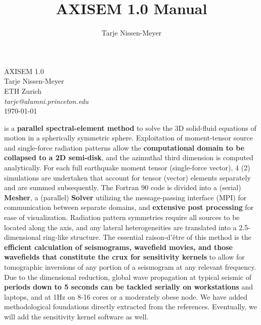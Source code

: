 \documentclass[11pt,letter,fleqn,english,notitlepage]{article}
\title{AXISEM 1.0 Manual}
\author{Tarje Nissen-Meyer}
\begin{document}
%
\pagestyle{fancy}
\thispagestyle{empty}
%
\begin{center}
{\LARGE {\sc AXISEM 1.0}}
\vspace{1.cm}\\
{\large 
Tarje Nissen-Meyer  \hspace*{0.1cm}
\vspace*{0.2cm}\\ 
ETH Zurich   \hspace*{0.3cm}
\vspace*{0.2cm}\\ 
\textit{tarje@alumni.princeton.edu} \hspace*{0.75cm}
\vspace*{0.5cm}\\ 
\today}
\end{center}
\vspace*{1.6cm}
 is a \textbf{parallel spectral-element method} to 
solve the 3D solid-fluid equations of motion in a spherically symmetric sphere. Exploitation 
of moment-tensor source and single-force radiation patterns allow the \textbf{computational domain 
to be collapsed to a 2D semi-disk}, and the azimuthal third dimension is computed analytically.
For each full earthquake moment tensor (single-force vector), 4 (2) simulations are undertaken that account for  
tensor (vector) elements separately and are summed subsequently.
The Fortran 90 code is divided into a (serial) \textbf{Mesher}, a (parallel) \textbf{Solver} utilizing the message-passing interface 
(MPI) for communication between separate domains, and \textbf{extensive post processing} for ease of visualization.
Radiation pattern symmetries require all sources 
to be located along the axis, and any lateral heterogeneities are translated into a 2.5-dimensional
ring-like structure.
The essential raison-d'\^{e}tre of this method is the \textbf{efficient calculation 
of seismograms, wavefield movies, and those wavefields that constitute the crux for 
sensitivity kernels} to allow for tomographic inversions of any portion of a seismogram at any relevant 
frequency. Due to the dimensional reduction, global 
wave propagation at typical seismic of \textbf{periods down to 5
  seconds can be tackled serially on workstations} and laptops, and
at 1Hz on 8-16 cores or a moderately obese node. 
We have added methodological foundations directly extracted from the references.
Eventually, we will add the sensitivity kernel software as well. \\
\end{document}
